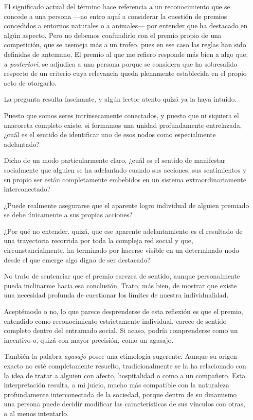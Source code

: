 \documentclass[12pt]{article}
\begin{document}
El significado actual del término hace referencia a un reconocimiento que se concede a una persona ---no entro aquí a considerar la cuestión de premios concedidos a entornos naturales o a animales--- por entender que ha destacado en algún aspecto. Pero no debemos confundirlo con el premio propio de una competición, que se asemeja más a un trofeo, pues en ese caso las reglas han sido definidas de antemano. El premio al que me refiero responde más bien a algo que, \emph{a posteriori}, se adjudica a una persona porque se considera que ha sobresalido respecto de un criterio cuya relevancia queda plenamente establecida en el propio acto de otorgarlo.

La pregunta resulta fascinante, y algún lector atento quizá ya la haya intuido.

Puesto que somos seres intrínsecamente conectados, y puesto que ni siquiera el anacoreta completo existe, si formamos una unidad profundamente entrelazada, ¿cuál es el sentido de identificar uno de esos nodos como especialmente adelantado?

Dicho de un modo particularmente claro, ¿cuál es el sentido de manifestar socialmente que alguien se ha adelantado cuando sus acciones, sus sentimientos y su propio ser están completamente embebidos en un sistema extraordinariamente interconectado?

¿Puede realmente asegurarse que el aparente logro individual de alguien premiado se debe únicamente a sus propias acciones?

¿Por qué no entender, quizá, que ese aparente adelantamiento es el resultado de una trayectoria recorrida por toda la compleja red social y que, circunstancialmente, ha terminado por hacerse visible en un determinado nodo desde el que emerge algo digno de ser destacado?

No trato de sentenciar que el premio carezca de sentido, aunque personalmente pueda inclinarme hacia esa conclusión. Trato, más bien, de mostrar que existe una necesidad profunda de cuestionar los límites de nuestra individualidad.

Aceptémoslo o no, lo que parece desprenderse de esta reflexión es que el premio, entendido como reconocimiento estrictamente individual, carece de sentido completo dentro del entramado social. Si acaso, podría comprenderse como un incentivo o, quizá con mayor precisión, como un agasajo.

También la palabra \emph{agasajo} posee una etimología sugerente. Aunque su origen exacto no esté completamente resuelto, tradicionalmente se la ha relacionado con la idea de tratar a alguien con afecto, hospitalidad o como a un compañero. Esta interpretación resulta, a mi juicio, mucho más compatible con la naturaleza profundamente interconectada de la sociedad, porque dentro de su dinamismo una persona puede decidir modificar las características de sus vínculos con otras, o al menos intentarlo.
\end{document}
